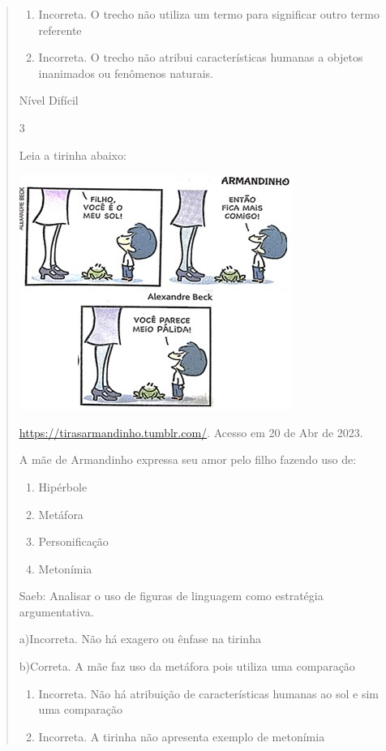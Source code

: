 {\begin{quote}
{\begin{enumerate}
\def\labelenumi{\arabic{enumi}.}
\item
  Incorreta. O trecho não utiliza um termo para significar outro termo
  referente
\item
  Incorreta. O trecho não atribui características humanas a objetos
  inanimados ou fenômenos naturais.
\end{enumerate}

Nível Difícil

\num{3}

Leia a tirinha abaixo:

\includegraphics[width=3.51042in,height=3.02083in]{./imgSAEB_7_POR/media/image14.png}

\href{https://tirasarmandinho.tumblr.com/}{\uline{https://tirasarmandinho.tumblr.com/}}.
Acesso em 20 de Abr de 2023.

A mãe de Armandinho expressa seu amor pelo filho fazendo uso de:

\begin{enumerate}

\item
  Hipérbole
\item
  Metáfora
\item
  Personificação
\item
  Metonímia
\end{enumerate}

Saeb: Analisar o uso de figuras de linguagem como estratégia
argumentativa.

a)Incorreta. Não há exagero ou ênfase na tirinha

b)Correta. A mãe faz uso da metáfora pois utiliza uma comparação

\begin{enumerate}
\def\labelenumi{\arabic{enumi}.}
\item
  Incorreta. Não há atribuição de características humanas ao sol e sim
  uma comparação
\item
  Incorreta. A tirinha não apresenta exemplo de metonímia
\end{enumerate}

}
\end{quote}}
